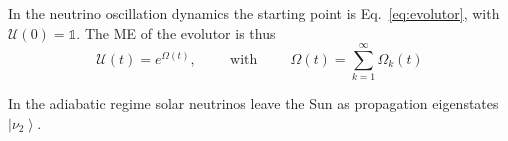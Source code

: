 \documentclass{article}
\newcommand{\ket}[1]{\left| #1 \right>}
\begin{document}
In the neutrino oscillation dynamics the starting point is Eq.~\ref{eq:evolutor}, with ${\mathcal{U}(0) = \mathbb{1}}$. The ME of the evolutor is thus
\begin{equation}
	\mathcal{U}(t) = e^{\Omega(t)},\hspace{1cm} \text{with} \hspace{1cm} \Omega(t) = \sum_{k=1}^\infty \Omega_k (t)
\end{equation}

In the adiabatic regime solar neutrinos leave the Sun as propagation eigenstates $\ket{\nu_2}$.



\end{document}
